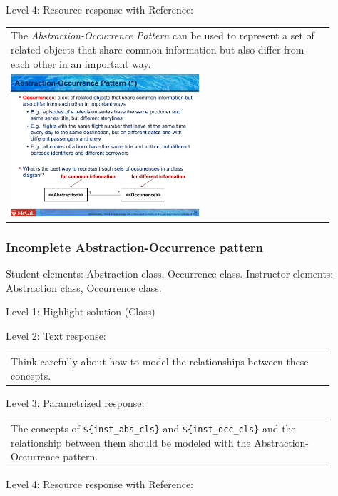 \noindent Level 4: Resource response with Reference: \medskip

\begin{tabular}{|p{0.9\linewidth}}
The \textit{Abstraction-Occurrence Pattern} can be used to 
represent a set of related objects that share common information but also differ
from each other in an important way.

\\
\includegraphics[width=0.6\textwidth]{images/abstraction_occurrence.png}
\end{tabular} \medskip


\subsubsection{Incomplete Abstraction-Occurrence pattern}

Student elements: Abstraction class, Occurrence class. Instructor elements: Abstraction class, Occurrence class. \medskip

\noindent Level 1: Highlight solution (Class) \medskip

\noindent Level 2: Text response: \medskip

\begin{tabular}{|p{0.9\linewidth}}
Think carefully about how to model the relationships between these concepts.
\end{tabular} \medskip

\noindent Level 3: Parametrized response: \medskip

\begin{tabular}{|p{0.9\linewidth}}
The concepts of \verb|${inst_abs_cls}| and \verb|${inst_occ_cls}| and the relationship between them should be modeled with the Abstraction-Occurrence pattern.
\end{tabular} \medskip

\noindent Level 4: Resource response with Reference: \medskip

